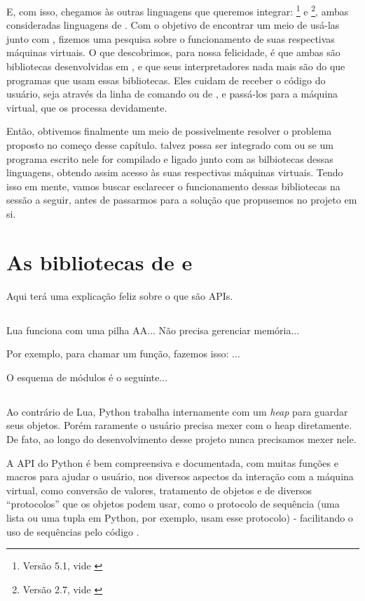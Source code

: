     E, com isso, chegamos às outras linguagens que queremos integrar:
    \footnote{Versão 5.1, vide \cite{lua:00}} e
    \footnote{Versão 2.7, vide \cite{python:00}}, ambas
    consideradas linguagens de \script{}. Com o objetivo de encontrar um meio de
    usá-las junto com \CXX{}, fizemos uma pesquisa sobre o funcionamento de suas
    respectivas máquinas virtuais. O que descobrimos, para nossa felicidade, é
    que ambas são bibliotecas desenvolvidas em \C{}, e que seus interpretadores
    nada mais são do que programas que usam essas bibliotecas. Eles cuidam de
    receber o código do usuário, seja através da linha de comando ou de
    , e passá-los para a máquina virtual, que os processa devidamente.
    
    Então, obtivemos finalmente um meio de possivelmente resolver o problema
    proposto no começo desse capítulo. \CXX{} talvez possa ser integrado com
     ou  se um programa escrito nele for compilado e
    ligado junto com as bilbiotecas dessas linguagens, obtendo assim acesso às
    suas respectivas máquinas virtuais. Tendo isso em mente, vamos buscar
    esclarecer o funcionamento dessas bibliotecas na sessão a seguir, antes de
    passarmos para a solução que propusemos no projeto em si.

  \section{As bibliotecas de  e }
  \label{cap:conceitos:apis}

    Aqui terá uma explicação feliz sobre o que são APIs.

    \subsection{}

      Lua funciona com uma pilha AA...
      Não precisa gerenciar memória...

      Por exemplo, para chamar um função, fazemos isso: ...

      O esquema de módulos é o seguinte...

    \subsection{}
    Ao contrário de Lua, Python trabalha internamente com um \emph{heap} para guardar seus objetos.
    Porém raramente o usuário precisa mexer com o heap diretamente. De fato, ao longo do desenvolvimento
    desse projeto nunca precisamos mexer nele.
    
    A API \C{} do Python é bem compreensiva e documentada, com muitas funções e macros para ajudar 
    o usuário, nos diversos aspectos da interação com a máquina virtual, como conversão de valores,
    tratamento de objetos e de diversos ``protocolos'' que os objetos podem usar, como o
    protocolo de sequência (uma lista ou uma tupla em Python, por exemplo, usam esse protocolo) -
    facilitando o uso de sequências pelo código \C{}.
    
    
